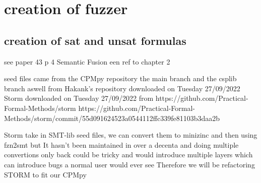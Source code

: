 \chapter{creation of fuzzer}
\label{cha:x}


\section{creation of sat and unsat formulas}
see paper 43 p 4
Semantic Fusion
\cite{43YinYang}
een ref to chapter 2

seed files came from the CPMpy repository the main branch and the csplib branch aswell from Hakank's repository downloaded on Tuesday 27/09/2022
Storm downloaded on Tuesday 27/09/2022 from https://github.com/Practical-Formal-Methods/storm 
https://github.com/Practical-Formal-Methods/storm/commit/55d091624523a0544112ffc339fe81103b3daa2b



Storm take in SMT-lib seed files, we can convert them to minizinc and then using fzn2smt but It hasn't been maintained in over a decenta and doing multiple convertions only back could be tricky and would introduce multiple layers which can introduce bugs a normal user would ever see
Therefore we will be refactoring STORM to fit our CPMpy


























